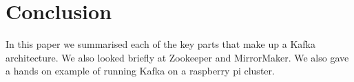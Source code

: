 \section{Conclusion}

In this paper we summarised each of the key parts that make up a Kafka architecture. We also looked briefly at Zookeeper and MirrorMaker. We also gave a hands on example of running Kafka on a raspberry pi cluster.